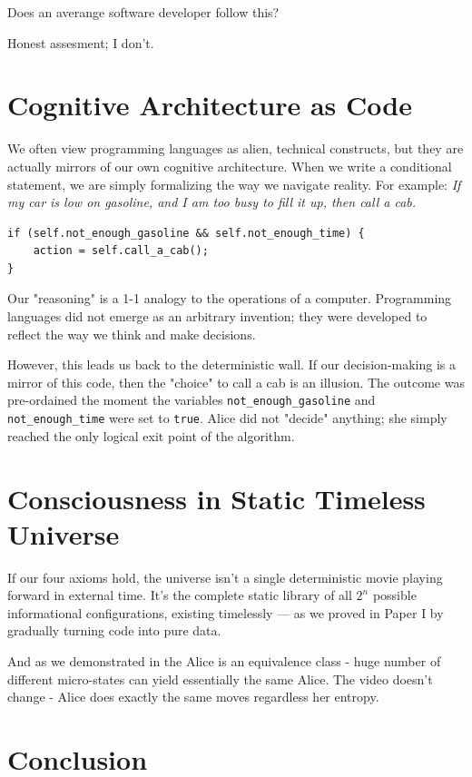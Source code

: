 Does an averange software developer follow this?

Honest assesment; I don't. 


\section{Cognitive Architecture as Code}

We often view programming languages as alien, technical constructs, but they are actually mirrors of our own cognitive architecture. When we write a conditional statement, we are simply formalizing the way we navigate reality. For example: \textit{If my car is low on gasoline, and I am too busy to fill it up, then call a cab.}

\begin{verbatim}
if (self.not_enough_gasoline && self.not_enough_time) {
    action = self.call_a_cab();
}
\end{verbatim}

Our "reasoning" is a 1-1 analogy to the operations of a computer. Programming languages did not emerge as an arbitrary invention; they were developed to reflect the way we think and make decisions. 

However, this leads us back to the deterministic wall. If our decision-making is a mirror of this code, then the "choice" to call a cab is an illusion.
The outcome was pre-ordained the moment the variables \texttt{not\_enough\_gasoline} and \texttt{not\_enough\_time} were set to \texttt{true}.
Alice did not "decide" anything; she simply reached the only logical exit point of the algorithm.


\section{Consciousness in Static Timeless Universe}

If our four axioms hold, the universe isn't a single deterministic movie playing forward in external time.
It's the complete static library of all $2^n$ possible informational configurations, existing timelessly — as we proved in Paper I by gradually turning code into pure data.

And as we demonstrated in the  Alice is an equivalence class - huge number of different
micro-states can yield essentially the same Alice. The video doesn't change - Alice does exactly the same moves regardless her entropy.


\section{Conclusion}

